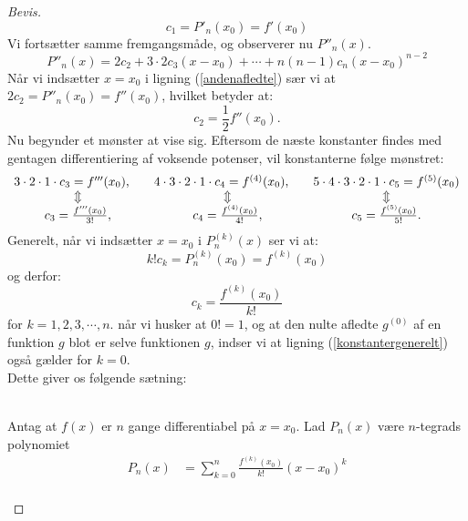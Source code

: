 \documentclass[12pt, a4paper]{article}
\begin{document}
\begin{refsection}
\begin{proof}[Bevis]
\begin{equation*}
    c_1=P'_n(x_0)=f'(x_0)
\end{equation*}
Vi fortsætter samme fremgangsmåde, og observerer nu $P''_n(x)$.
\begin{equation}\label{andenafledte}
    P''_n(x)=2c_2+ 3\cdot2c_3(x-x_0)+\cdots+n(n-1)c_n(x-x_0)^{n-2}
\end{equation}
Når vi indsætter $x=x_0$ i ligning (\ref{andenafledte}) sær vi at $2c_2 = P''_n(x_0)=f''(x_0)$, hvilket betyder at:
\begin{equation*}
    c_2=\frac{1}{2}f''(x_0).
\end{equation*}
Nu begynder et mønster at vise sig. Eftersom de næste konstanter findes med gentagen differentiering af voksende potenser, vil konstanterne følge mønstret: 
\begin{equation*}
    \begin{array}{c c c}
        3\cdot2\cdot1\cdot c_3=f'''(x_0),\quad &4\cdot3\cdot2\cdot1\cdot c_4=f^{(4)}(x_0),\quad&5\cdot4\cdot3\cdot2\cdot1\cdot c_5=f^{(5)}(x_0)\\
        \Updownarrow&\Updownarrow&\Updownarrow\\
        c_3=\frac{f'''(x_0)}{3!},&c_4=\frac{f^{(4)}(x_0)}{4!},&c_5=\frac{f^{(5)}(x_0)}{5!}.
    \end{array}
\end{equation*}
Generelt, når vi indsætter $x=x_0$ i $P_n^{(k)}(x)$ ser vi at:
\begin{equation*}
    k!c_k=P_n^{(k)}(x_0)=f^{(k)}(x_0)
\end{equation*}
og derfor:
\begin{equation}\label{konstantergenerelt}
    \boxed{c_k=\frac{f^{(k)}(x_0)}{k!}}
\end{equation}
for $k=1,2,3,\cdots,n$. når vi husker at $0!=1$, og at den nulte afledte  $g^{(0)}$ af en funktion $g$ blot er selve funktionen $g$, indser vi at ligning (\ref{konstantergenerelt}) også gælder for $k=0$.\\
Dette giver os følgende sætning:\\
\\
   \begin{savenotes}
\begin{mdframed}
Antag at $f(x)$ er $n$ gange differentiabel på $x=x_0$. Lad $P_n(x)$ være $n$-tegrads polynomiet
\begin{equation}
    \begin{aligned}
        P_n(x)&=\sum_{k=0}^n\frac{f^{(k)}(x_0)}{k!}(x-x_0)^k\\

\end{aligned}
\end{equation}
\end{mdframed}
\end{savenotes}
\end{proof}
\end{refsection}
\end{document}

